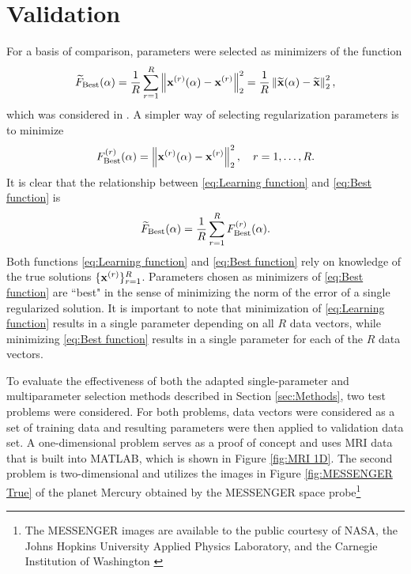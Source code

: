 \documentclass[12pt]{article}
\begin{document}
\section{Validation} \label{sec:Validation}
For a basis of comparison, parameters were selected as minimizers of the function
\begin{equation}
\label{eq:Learning function}
\widetilde{F}_{\text{Best}}(\alpha) = \frac{1}{R}\sum_{r=1}^R \left\|\mathbf{x}^{(r)}(\alpha) - \mathbf{x}^{(r)}\right\|_2^2 = \frac{1}{R}\left\|\widetilde{\mathbf{x}}(\alpha) - \widetilde{\mathbf{x}}\right\|_2^2,
\end{equation} 
which was considered in \cite{ChungEspanol2017}. A simpler way of selecting regularization parameters is to minimize
\begin{equation}
\label{eq:Best function}
F_{\text{Best}}^{(r)}(\alpha) = \left\|\mathbf{x}^{(r)}(\alpha) - \mathbf{x}^{(r)}\right\|_2^2, \quad r = 1,\ldots,R.
\end{equation}
It is clear that the relationship between \eqref{eq:Learning function} and \eqref{eq:Best function} is
\[\widetilde{F}_{\text{Best}}(\alpha) = \frac{1}{R}\sum_{r=1}^R F_{\text{Best}}^{(r)}(\alpha).\]
Both functions \eqref{eq:Learning function} and \eqref{eq:Best function} rely on knowledge of the true solutions $\{\mathbf{x}^{(r)}\}_{r=1}^R$. Parameters chosen as minimizers of \eqref{eq:Best function} are ``best" in the sense of minimizing the norm of the error of a single regularized solution. It is important to note that minimization of \eqref{eq:Learning function} results in a single parameter depending on all $R$ data vectors, while minimizing \eqref{eq:Best function} results in a single parameter for each of the $R$ data vectors. \par
To evaluate the effectiveness of both the adapted single-parameter and multiparameter selection methods described in Section \ref{sec:Methods}, two test problems were considered. For both problems, data vectors were considered as a set of training data and resulting parameters were then applied to validation data set. A one-dimensional problem serves as a proof of concept and uses MRI data that is built into MATLAB, which is shown in Figure \ref{fig:MRI 1D}.  The second problem is two-dimensional and  utilizes the images in Figure \ref{fig:MESSENGER True} of the planet Mercury obtained by the MESSENGER space probe\footnote{  The MESSENGER images are available to the public courtesy of NASA, the Johns Hopkins University Applied Physics Laboratory, and the Carnegie Institution of Washington \cite{MESSENGER}}
\end{document}
